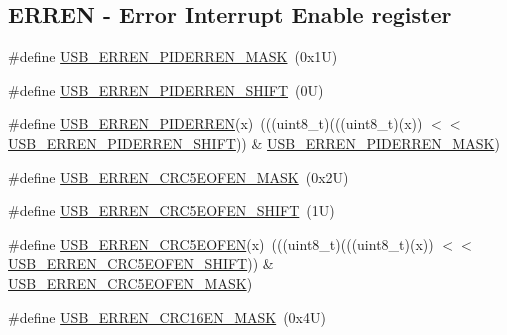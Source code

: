 \subsection*{E\+R\+R\+EN -\/ Error Interrupt Enable register}
\begin{DoxyCompactItemize}
\item 
\#define \mbox{\hyperlink{group___u_s_b___register___masks_ga971e0d8939196ec3990a73b4db4030ad}{U\+S\+B\+\_\+\+E\+R\+R\+E\+N\+\_\+\+P\+I\+D\+E\+R\+R\+E\+N\+\_\+\+M\+A\+SK}}~(0x1\+U)
\item 
\#define \mbox{\hyperlink{group___u_s_b___register___masks_ga47a2a895b1b94a32aa482d11173e2fb9}{U\+S\+B\+\_\+\+E\+R\+R\+E\+N\+\_\+\+P\+I\+D\+E\+R\+R\+E\+N\+\_\+\+S\+H\+I\+FT}}~(0\+U)
\item 
\#define \mbox{\hyperlink{group___u_s_b___register___masks_gac8aff57d3636da4ea876d6b9666eb9c8}{U\+S\+B\+\_\+\+E\+R\+R\+E\+N\+\_\+\+P\+I\+D\+E\+R\+R\+EN}}(x)~(((uint8\+\_\+t)(((uint8\+\_\+t)(x)) $<$$<$ \mbox{\hyperlink{group___u_s_b___register___masks_ga47a2a895b1b94a32aa482d11173e2fb9}{U\+S\+B\+\_\+\+E\+R\+R\+E\+N\+\_\+\+P\+I\+D\+E\+R\+R\+E\+N\+\_\+\+S\+H\+I\+FT}})) \& \mbox{\hyperlink{group___u_s_b___register___masks_ga971e0d8939196ec3990a73b4db4030ad}{U\+S\+B\+\_\+\+E\+R\+R\+E\+N\+\_\+\+P\+I\+D\+E\+R\+R\+E\+N\+\_\+\+M\+A\+SK}})
\item 
\#define \mbox{\hyperlink{group___u_s_b___register___masks_gafab72bb1aedf0d529c720a25d6ee93da}{U\+S\+B\+\_\+\+E\+R\+R\+E\+N\+\_\+\+C\+R\+C5\+E\+O\+F\+E\+N\+\_\+\+M\+A\+SK}}~(0x2\+U)
\item 
\#define \mbox{\hyperlink{group___u_s_b___register___masks_gafc8288624f2373be283f408a290f3daf}{U\+S\+B\+\_\+\+E\+R\+R\+E\+N\+\_\+\+C\+R\+C5\+E\+O\+F\+E\+N\+\_\+\+S\+H\+I\+FT}}~(1\+U)
\item 
\#define \mbox{\hyperlink{group___u_s_b___register___masks_ga0fdb8376f0e47f96561ee2953e225ff6}{U\+S\+B\+\_\+\+E\+R\+R\+E\+N\+\_\+\+C\+R\+C5\+E\+O\+F\+EN}}(x)~(((uint8\+\_\+t)(((uint8\+\_\+t)(x)) $<$$<$ \mbox{\hyperlink{group___u_s_b___register___masks_gafc8288624f2373be283f408a290f3daf}{U\+S\+B\+\_\+\+E\+R\+R\+E\+N\+\_\+\+C\+R\+C5\+E\+O\+F\+E\+N\+\_\+\+S\+H\+I\+FT}})) \& \mbox{\hyperlink{group___u_s_b___register___masks_gafab72bb1aedf0d529c720a25d6ee93da}{U\+S\+B\+\_\+\+E\+R\+R\+E\+N\+\_\+\+C\+R\+C5\+E\+O\+F\+E\+N\+\_\+\+M\+A\+SK}})
\item 
\#define \mbox{\hyperlink{group___u_s_b___register___masks_gae216c42729f6b3d992001136744fe341}{U\+S\+B\+\_\+\+E\+R\+R\+E\+N\+\_\+\+C\+R\+C16\+E\+N\+\_\+\+M\+A\+SK}}~(0x4\+U)
\item 

\end{DoxyCompactItemize}
